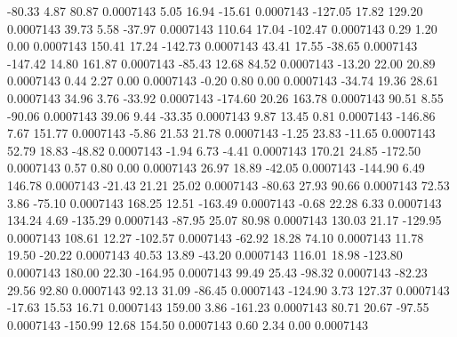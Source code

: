       -80.33        4.87       80.87     0.0007143
        5.05       16.94      -15.61     0.0007143
     -127.05       17.82      129.20     0.0007143
       39.73        5.58      -37.97     0.0007143
      110.64       17.04     -102.47     0.0007143
        0.29        1.20        0.00     0.0007143
      150.41       17.24     -142.73     0.0007143
       43.41       17.55      -38.65     0.0007143
     -147.42       14.80      161.87     0.0007143
      -85.43       12.68       84.52     0.0007143
      -13.20       22.00       20.89     0.0007143
        0.44        2.27        0.00     0.0007143
       -0.20        0.80        0.00     0.0007143
      -34.74       19.36       28.61     0.0007143
       34.96        3.76      -33.92     0.0007143
     -174.60       20.26      163.78     0.0007143
       90.51        8.55      -90.06     0.0007143
       39.06        9.44      -33.35     0.0007143
        9.87       13.45        0.81     0.0007143
     -146.86        7.67      151.77     0.0007143
       -5.86       21.53       21.78     0.0007143
       -1.25       23.83      -11.65     0.0007143
       52.79       18.83      -48.82     0.0007143
       -1.94        6.73       -4.41     0.0007143
      170.21       24.85     -172.50     0.0007143
        0.57        0.80        0.00     0.0007143
       26.97       18.89      -42.05     0.0007143
     -144.90        6.49      146.78     0.0007143
      -21.43       21.21       25.02     0.0007143
      -80.63       27.93       90.66     0.0007143
       72.53        3.86      -75.10     0.0007143
      168.25       12.51     -163.49     0.0007143
       -0.68       22.28        6.33     0.0007143
      134.24        4.69     -135.29     0.0007143
      -87.95       25.07       80.98     0.0007143
      130.03       21.17     -129.95     0.0007143
      108.61       12.27     -102.57     0.0007143
      -62.92       18.28       74.10     0.0007143
       11.78       19.50      -20.22     0.0007143
       40.53       13.89      -43.20     0.0007143
      116.01       18.98     -123.80     0.0007143
      180.00       22.30     -164.95     0.0007143
       99.49       25.43      -98.32     0.0007143
      -82.23       29.56       92.80     0.0007143
       92.13       31.09      -86.45     0.0007143
     -124.90        3.73      127.37     0.0007143
      -17.63       15.53       16.71     0.0007143
      159.00        3.86     -161.23     0.0007143
       80.71       20.67      -97.55     0.0007143
     -150.99       12.68      154.50     0.0007143
        0.60        2.34        0.00     0.0007143
